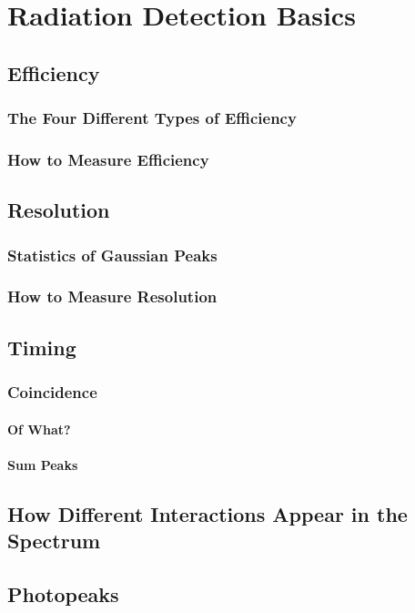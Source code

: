 \chapter{Radiation Detection Basics}

\section{Efficiency}
\subsection{The Four Different Types of Efficiency}
\subsection{How to Measure Efficiency}

\section{Resolution}
\subsection{Statistics of Gaussian Peaks}
\subsection{How to Measure Resolution}

\section{Timing}
\subsection{Coincidence}
\subsubsection{Of What?}
\subsubsection{Sum Peaks}

\section{How Different Interactions Appear in the Spectrum}
\section{Photopeaks}
